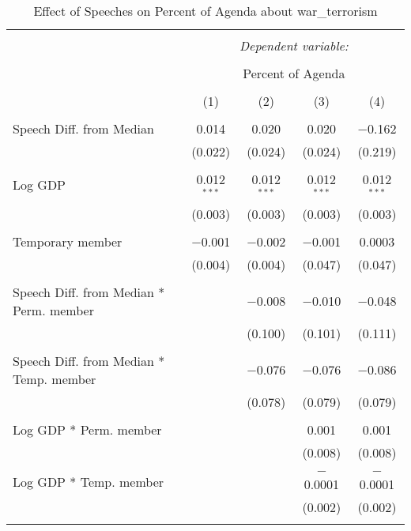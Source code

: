 
\begin{table}[!htbp] \centering 
  \caption{Effect of Speeches on Percent of Agenda about  war_terrorism} 
  \label{} 
\begin{tabular}{@{\extracolsep{5pt}}lcccc} 
\\[-1.8ex]\hline 
\hline \\[-1.8ex] 
 & \multicolumn{4}{c}{\textit{Dependent variable:}} \\ 
\cline{2-5} 
\\[-1.8ex] & \multicolumn{4}{c}{Percent of Agenda} \\ 
\\[-1.8ex] & (1) & (2) & (3) & (4)\\ 
\hline \\[-1.8ex] 
 Speech Diff. from Median & 0.014 & 0.020 & 0.020 & $-$0.162 \\ 
  & (0.022) & (0.024) & (0.024) & (0.219) \\ 
  & & & & \\ 
 Log GDP & 0.012$^{***}$ & 0.012$^{***}$ & 0.012$^{***}$ & 0.012$^{***}$ \\ 
  & (0.003) & (0.003) & (0.003) & (0.003) \\ 
  & & & & \\ 
 Temporary member & $-$0.001 & $-$0.002 & $-$0.001 & 0.0003 \\ 
  & (0.004) & (0.004) & (0.047) & (0.047) \\ 
  & & & & \\ 
 Speech Diff. from Median * Perm. member &  & $-$0.008 & $-$0.010 & $-$0.048 \\ 
  &  & (0.100) & (0.101) & (0.111) \\ 
  & & & & \\ 
 Speech Diff. from Median * Temp. member &  & $-$0.076 & $-$0.076 & $-$0.086 \\ 
  &  & (0.078) & (0.079) & (0.079) \\ 
  & & & & \\ 
 Log GDP * Perm. member &  &  & 0.001 & 0.001 \\ 
  &  &  & (0.008) & (0.008) \\ 
  & & & & \\ 
 Log GDP * Temp. member &  &  & $-$0.0001 & $-$0.0001 \\ 
  &  &  & (0.002) & (0.002) \\ 
  & & & & \\ 

\end{tabular}
\end{table}

